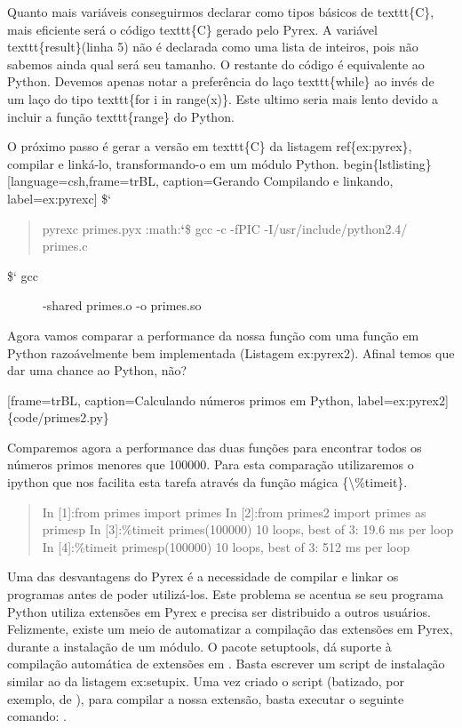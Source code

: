 \documentclass[a4paper,10pt,brazil]{sphinxmanual}
\begin{document}
Quanto mais variáveis conseguirmos declarar como tipos básicos de texttt\{C\}, mais eficiente será o código texttt\{C\} gerado pelo Pyrex. A variável texttt\{result\}(linha 5) não é declarada como uma lista de inteiros, pois não sabemos ainda qual será seu tamanho. O restante do código é equivalente ao Python. Devemos apenas notar a preferência do laço texttt\{while\} ao invés de um laço do tipo texttt\{for i in range(x)\}. Este ultimo seria mais lento devido a incluir a função texttt\{range\} do Python.

O próximo passo é gerar a versão em texttt\{C\} da listagem ref\{ex:pyrex\}, compilar e linká-lo, transformando-o em um módulo Python.
begin\{lstlisting\}{[}language=csh,frame=trBL, caption=Gerando Compilando e linkando, label=ex:pyrexc{]}
\${}`
\begin{quote}

pyrexc primes.pyx
:math:{\color{red}\bfseries{}{}`}\$ gcc -c -fPIC -I/usr/include/python2.4/ primes.c
\end{quote}
\begin{description}
\item[{\${}` gcc}] \leavevmode
-shared primes.o -o primes.so

\end{description}

Agora vamos comparar a performance da nossa função com uma função
em Python razoávelmente bem implementada (Listagem ex:pyrex2).
Afinal temos que dar uma chance ao Python, não?

{[}frame=trBL, caption=Calculando números primos em Python, label=ex:pyrex2{]} \{code/primes2.py\}

Comparemos agora a performance das duas funções para encontrar
todos os números primos menores que 100000. Para esta comparação
utilizaremos o ipython que nos facilita esta tarefa através da
função mágica \{\textbackslash{}\%timeit\}.
\begin{quote}

In {[}1{]}:from primes import primes In {[}2{]}:from primes2 import primes
as primesp In {[}3{]}:\%timeit primes(100000) 10 loops, best of 3: 19.6
ms per loop In {[}4{]}:\%timeit primesp(100000) 10 loops, best of 3: 512
ms per loop
\end{quote}

Uma das desvantagens do Pyrex é a necessidade de compilar e linkar
os programas antes de poder utilizá-los. Este problema se acentua
se seu programa Python utiliza extensões em Pyrex e precisa ser
distribuido a outros usuários. Felizmente, existe um meio de
automatizar a compilação das extensões em Pyrex, durante a
instalação de um módulo. O pacote setuptools, dá suporte à
compilação automática de extensões em . Basta escrever um
script de instalação similar ao da listagem ex:setupix. Uma vez
criado o script (batizado, por exemplo, de ), para
compilar a nossa extensão, basta executar o seguinte comando:
.
\end{document}
